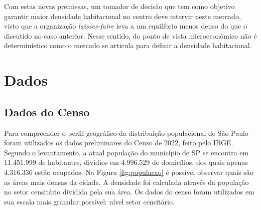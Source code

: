 
Com estas novas premissas, um tomador de decisão que tem como objetivo garantir maior densidade habitacional no centro deve intervir neste mercado, visto que a organização \textit{laisses-faire} leva a um equilíbrio menos denso do que o discutido no caso anterior. Nesse sentido, do ponto de vista microeconômico não é determinístico como o mercado se articula para definir a densidade habitacional.


\chapter{Dados}
\label{sec:dados}

\section*{Dados do Censo}

Para compreender o perfil geográfico da distribuição populacional de São Paulo foram utilizados os dados preliminares do Censo de 2022, feito pelo IBGE. Segundo o levantamento, a atual população do município de SP se encontra em 11.451.999 de habitantes, dividios em 4.996.529 de domicílios, dos quais apenas 4.316.336 estão ocupados. Na Figura \ref{fig:populacao} é possível observar quais são as áreas mais densas da cidade. A densidade foi calculada através da população no setor censitário dividida pela sua área. Os dados do censo foram utilizados em sua escala mais granular possível: nível setor censitário. 

